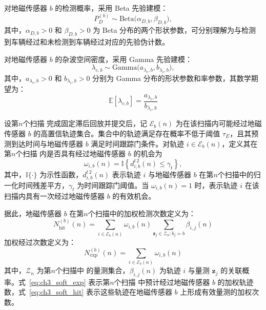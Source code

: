 \documentclass{xdupgthesis}
\begin{document}
对地磁传感器 $b$ 的检测概率，采用 Beta 先验建模：
\begin{equation}
	P_D^{(b)}\sim \mathrm{Beta}\bigl(\alpha_{D,b},\beta_{D,b}\bigr),
	\label{eq:ch3_beta_prior}
\end{equation}
其中，$\alpha_{D,b}>0$ 和 $\beta_{D,b}>0$ 为 Beta 分布的两个形状参数，可分别理解为与检测到车辆经过和未检测到车辆经过对应的先验伪计数。

对地磁传感器 $b$ 的杂波空间密度，采用 Gamma 先验建模：
\begin{equation}
	\lambda_{c,b}\sim \mathrm{Gamma}\bigl(a_{\lambda_c,b},b_{\lambda_c,b}\bigr),
	\label{eq:ch3_gamma_prior}
\end{equation}
其中，$a_{\lambda_c,b}>0$ 和 $b_{\lambda_c,b}>0$ 分别为 Gamma 分布的形状参数和率参数，其数学期望为：
\begin{equation}
	\mathbb{E}[\lambda_{c,b}]
	=
	\frac{a_{\lambda_c,b}}{b_{\lambda_c,b}}
	\label{eq:ch3_kappa_mean}
\end{equation}

设第$n$个扫描 完成固定滞后回放并提交后，记 $\mathcal E_b(n)$ 为在该扫描内可能经过地磁传感器 $b$ 的高置信轨迹集合。集合中的轨迹满足存在概率不低于阈值 $\tau_E$，且其预测到达时间与地磁传感器 $b$ 满足时间跟踪门条件。对轨迹 $i\in\mathcal E_b(n)$，定义其在第$n$个扫描 内是否具有经过地磁传感器 $b$ 的机会为
\begin{equation}
	\omega_{i,b}(n)
	=
	\mathbb I\left\{d^{t\,2}_{i,b}(n)\le \gamma_t\right\},
	\label{eq:ch3_pass_indicator}
\end{equation}
其中，$\mathbb I\{\cdot\}$ 为示性函数，$d^{t\,2}_{i,b}(n)$ 表示轨迹 $i$ 与地磁传感器 $b$ 在第$n$个扫描中的归一化时间残差平方，$\gamma_t$ 为时间跟踪门阈值。当 $\omega_{i,b}(n)=1$ 时，表示轨迹 $i$ 在该扫描内具有一次经过地磁传感器 $b$ 的有效机会。

据此，地磁传感器 $b$ 在第$n$个扫描中的加权检测次数定义为：
\begin{equation}
	N_{\mathrm{hit}}^{(b)}(n)
	=
	\sum_{i\in\mathcal E_b(n)}
	\omega_{i,b}(n)
	\sum_{\mathbf z_j\in \mathcal Z_n:b_j=b}
	\beta_{i,j}(n)
	\label{eq:ch3_soft_hit}
\end{equation}
加权经过次数定义为：
\begin{equation}
	N_{\mathrm{exp}}^{(b)}(n)
	=
	\sum_{i\in\mathcal E_b(n)}
	\omega_{i,b}(n)
	\label{eq:ch3_soft_exp}
\end{equation}
其中，$\mathcal Z_n$ 为第$n$个扫描中 的量测集合，$\beta_{i,j}(n)$ 为轨迹 $i$ 与量测 $\mathbf z_j$ 的关联概率。式~\eqref{eq:ch3_soft_exp} 表示第$n$个扫描 中预计经过地磁传感器 $b$ 的加权轨迹数，式~\eqref{eq:ch3_soft_hit} 表示这些轨迹在地磁传感器 $b$ 上形成有效量测的加权次数。
\end{document}
